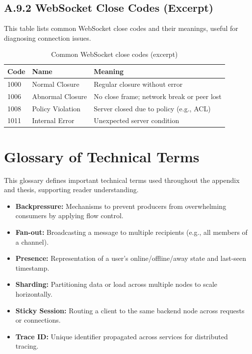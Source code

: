 \subsection*{A.9.2 WebSocket Close Codes (Excerpt)}
This table lists common WebSocket close codes and their meanings, useful for diagnosing connection issues.
\begin{table}[h]
\centering
\caption{Common WebSocket close codes (excerpt)}
\label{tab:ws-codes}
\begin{tabular}{l l p{8cm}}
\toprule
\textbf{Code} & \textbf{Name} & \textbf{Meaning} \\
\midrule
1000 & Normal Closure & Regular closure without error \\
1006 & Abnormal Closure & No close frame; network break or peer lost \\
1008 & Policy Violation & Server closed due to policy (e.g., ACL) \\
1011 & Internal Error & Unexpected server condition \\
\bottomrule
\end{tabular}
\end{table}


\section{Glossary of Technical Terms}
This glossary defines important technical terms used throughout the appendix and thesis, supporting reader understanding.
\label{app:glossary}
\begin{itemize}
  \item \textbf{Backpressure:} Mechanisms to prevent producers from overwhelming consumers by applying flow control.
  \item \textbf{Fan-out:} Broadcasting a message to multiple recipients (e.g., all members of a channel).
  \item \textbf{Presence:} Representation of a user's online/offline/away state and last-seen timestamp.
  \item \textbf{Sharding:} Partitioning data or load across multiple nodes to scale horizontally.
  \item \textbf{Sticky Session:} Routing a client to the same backend node across requests or connections.
  \item \textbf{Trace ID:} Unique identifier propagated across services for distributed tracing.
\end{itemize}

